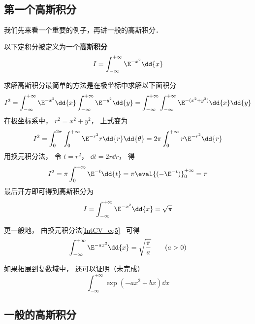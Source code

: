 

\subsection{第一个高斯积分}

我们先来看一个重要的例子，再讲一般的高斯积分．

以下定积分被定义为一个\textbf{高斯积分}
\begin{equation}
I = \int_{-\infty}^{+\infty} \E^{-x^2}\dd{x}
\end{equation}

求解高斯积分最简单的方法是在极坐标中求解以下面积分
\begin{equation}
I^2 = \int_{-\infty}^{+\infty} \E^{-x^2}\dd{x} \int_{-\infty}^{+\infty} \E^{-y^2}\dd{y}
=\int_{-\infty}^{+\infty}\int_{-\infty}^{+\infty} \E^{-(x^2 + y^2)} \dd{x}\dd{y}
\end{equation}
在极坐标系中， $r^2 = x^2 + y^2$， 上式变为
\begin{equation}
I^2 = \int_0^{2\pi} \int_0^{+\infty} \E^{-r^2} r\dd{r}\dd{\theta}
= 2\pi \int_0^{+\infty} r\E^{-r^2} \dd{r}
\end{equation}
用换元积分法， 令 $t = r^2$， $\dd{t} = 2r\dd{r}$， 得
\begin{equation}
I^2 = \pi \int_0^{+\infty} \E^{-t} \dd{t} = \pi \eval{(-\E^{-t})}_0^{+\infty} = \pi
\end{equation}
最后开方即可得到高斯积分为
\begin{equation}\label{GsInt_eq1}
I = \int_{-\infty}^{+\infty} \E^{-x^2}\dd{x} = \sqrt{\pi}
\end{equation}

更一般地， 由换元积分法\autoref{IntCV_eq5}~ 可得
\begin{equation}
\int_{-\infty}^{+\infty} \E^{-a x^2}\dd{x} = \sqrt{\frac{\pi}{a}} \qquad (a > 0)
\end{equation}

如果拓展到复数域中， 还可以证明（未完成）
\begin{equation}
\int_{-\infty}^{+\infty} \exp(-ax^2 + bx) \dd{x}
\end{equation}


\subsection{一般的高斯积分}

